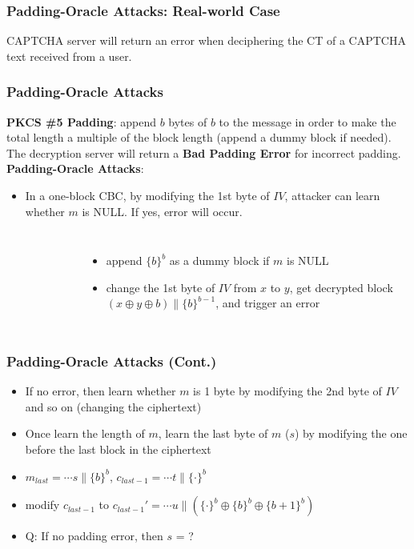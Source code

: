 \begin{frame}\frametitle{Padding-Oracle Attacks: Real-world Case}
CAPTCHA server will return an error when deciphering the CT of a CAPTCHA text received from a user.
\begin{figure}
\begin{center}

\end{center}
\end{figure}
\end{frame}
\begin{frame}\frametitle{Padding-Oracle Attacks}
\textbf{PKCS \#5 Padding}:  append $b$ bytes of $b$ to the message in order to make the total length a multiple of the block length (append a dummy block if needed). The decryption server will return a \textbf{Bad Padding Error} for incorrect padding.\\
\textbf{Padding-Oracle Attacks}: 
\begin{itemize}
\item In a one-block CBC, by modifying the 1st byte of $IV$, attacker can learn whether $m$ is NULL. If yes, error will occur. 
\end{itemize}
\begin{columns}[c]
\begin{figure}
\begin{center}

\end{center}
\end{figure}
\begin{itemize}
\item append $\{b\}^b$ as a dummy block if $m$ is NULL
\item change the 1st byte of $IV$ from $x$ to $y$, get decrypted block $(x \oplus y \oplus b) \| \{b\}^{b-1}$, and trigger an error
\end{itemize}
\end{columns}
\end{frame}
\begin{frame}\frametitle{Padding-Oracle Attacks (Cont.)}
\begin{figure}
\begin{center}

\end{center}
\end{figure}
\begin{itemize}
\item If no error, then learn whether $m$ is 1 byte by modifying the 2nd byte of $IV$ and so on (changing the ciphertext)
\item Once learn the length of $m$, learn the last byte of $m$ ($s$) by modifying the one before the last block in the ciphertext
\item $m_{last} = \cdots s \| \{b\}^{b}$, $c_{last-1} = \cdots t \| \{\cdot \}^{b} $
\item modify $c_{last-1}$ to $c_{last-1}' = \cdots u \| (\{\cdot \}^{b} \oplus \{b\}^{b} \oplus \{b+1\}^{b}) $
\item \alert{Q: If no padding error, then $s$ = ?}
\end{itemize}
\end{frame}
